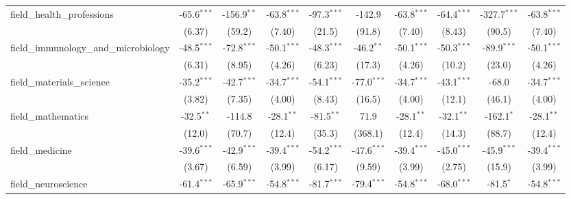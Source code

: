 \begin{tabular}{lccccccccc}
   field\_health\_professions                                  & -65.6$^{***}$  & -156.9$^{**}$  & -63.8$^{***}$ & -97.3$^{***}$  & -142.9         & -63.8$^{***}$ & -64.4$^{***}$  & -327.7$^{***}$ & -63.8$^{***}$\\   
                                                               & (6.37)         & (59.2)         & (7.40)        & (21.5)         & (91.8)         & (7.40)        & (8.43)         & (90.5)         & (7.40)\\   
   field\_immunology\_and\_microbiology                        & -48.5$^{***}$  & -72.8$^{***}$  & -50.1$^{***}$ & -48.3$^{***}$  & -46.2$^{**}$   & -50.1$^{***}$ & -50.3$^{***}$  & -89.9$^{***}$  & -50.1$^{***}$\\   
                                                               & (6.31)         & (8.95)         & (4.26)        & (6.23)         & (17.3)         & (4.26)        & (10.2)         & (23.0)         & (4.26)\\   
   field\_materials\_science                                   & -35.2$^{***}$  & -42.7$^{***}$  & -34.7$^{***}$ & -54.1$^{***}$  & -77.0$^{***}$  & -34.7$^{***}$ & -43.1$^{***}$  & -68.0          & -34.7$^{***}$\\   
                                                               & (3.82)         & (7.35)         & (4.00)        & (8.43)         & (16.5)         & (4.00)        & (12.1)         & (46.1)         & (4.00)\\   
   field\_mathematics                                          & -32.5$^{**}$   & -114.8         & -28.1$^{**}$  & -81.5$^{**}$   & 71.9           & -28.1$^{**}$  & -32.1$^{**}$   & -162.1$^{*}$   & -28.1$^{**}$\\   
                                                               & (12.0)         & (70.7)         & (12.4)        & (35.3)         & (368.1)        & (12.4)        & (14.3)         & (88.7)         & (12.4)\\   
   field\_medicine                                             & -39.6$^{***}$  & -42.9$^{***}$  & -39.4$^{***}$ & -54.2$^{***}$  & -47.6$^{***}$  & -39.4$^{***}$ & -45.0$^{***}$  & -45.9$^{***}$  & -39.4$^{***}$\\   
                                                               & (3.67)         & (6.59)         & (3.99)        & (6.17)         & (9.59)         & (3.99)        & (2.75)         & (15.9)         & (3.99)\\   
   field\_neuroscience                                         & -61.4$^{***}$  & -65.9$^{***}$  & -54.8$^{***}$ & -81.7$^{***}$  & -79.4$^{***}$  & -54.8$^{***}$ & -68.0$^{***}$  & -81.5$^{*}$    & -54.8$^{***}$\\   

\end{tabular}
